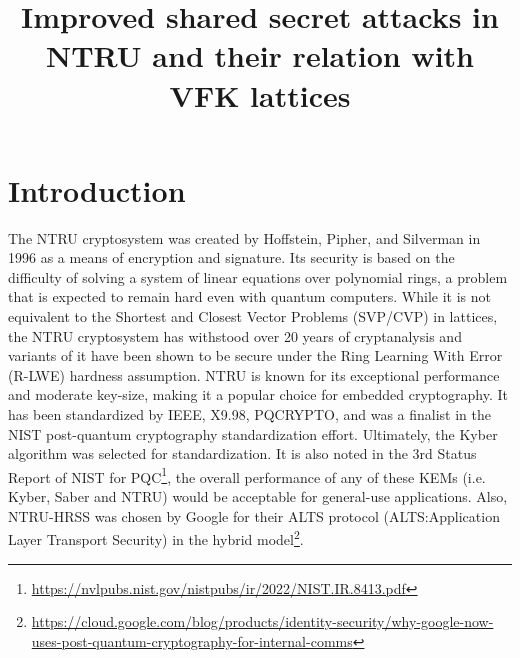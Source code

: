 \documentclass{amsart}
\numberwithin{equation}{section}
\begin{document}
	\title[Improved shared secret attacks in NTRU]{Improved shared secret attacks in NTRU and their relation with VFK lattices}
\maketitle	
	\begin{abstract}
		\end{abstract}
\section{Introduction}
The NTRU cryptosystem was created by Hoffstein, Pipher, and Silverman in 1996 as a means of encryption and signature. Its security is based on the difficulty of solving a system of linear equations over polynomial rings, a problem that is expected to remain hard even with quantum computers. While it is not equivalent to the Shortest and Closest Vector Problems (SVP/CVP) in lattices, the NTRU cryptosystem has withstood over 20 years of cryptanalysis and variants of it have been shown to be secure under the Ring Learning With Error (R-LWE) hardness assumption. NTRU is known for its exceptional performance and moderate key-size, making it a popular choice for embedded cryptography. It has been standardized by IEEE, X9.98, PQCRYPTO, and was a finalist in the NIST post-quantum cryptography standardization effort. Ultimately, the Kyber algorithm was selected for standardization. It is also noted in the  3rd Status Report of NIST for PQC\footnote{\url{https://nvlpubs.nist.gov/nistpubs/ir/2022/NIST.IR.8413.pdf}}, the overall performance of any of these KEMs (i.e. Kyber, Saber and NTRU) would be acceptable for general-use applications. Also, NTRU-HRSS was chosen by Google for their ALTS protocol (ALTS:Application Layer Transport Security) in the hybrid model\footnote{\url{https://cloud.google.com/blog/products/identity-security/why-google-now-uses-post-quantum-cryptography-for-internal-comms}}.
\end{document}
